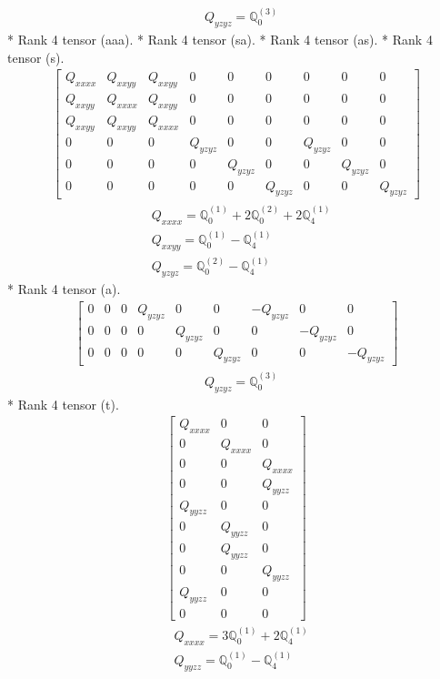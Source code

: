 \documentclass[fleqn,8pt,landscape]{jsarticle}
\begin{document}
\begin{align*}
& Q_{yzyz} = \mathbb{Q}_{0}^{(3)}
\end{align*}
* Rank 4 tensor (aaa).
* Rank 4 tensor (sa).
* Rank 4 tensor (as).
* Rank 4 tensor (s).
\begin{align*}
\begin{bmatrix} Q_{xxxx} & Q_{xxyy} & Q_{xxyy} & 0 & 0 & 0 & 0 & 0 & 0 \\ Q_{xxyy} & Q_{xxxx} & Q_{xxyy} & 0 & 0 & 0 & 0 & 0 & 0 \\ Q_{xxyy} & Q_{xxyy} & Q_{xxxx} & 0 & 0 & 0 & 0 & 0 & 0 \\ 0 & 0 & 0 & Q_{yzyz} & 0 & 0 & Q_{yzyz} & 0 & 0 \\ 0 & 0 & 0 & 0 & Q_{yzyz} & 0 & 0 & Q_{yzyz} & 0 \\ 0 & 0 & 0 & 0 & 0 & Q_{yzyz} & 0 & 0 & Q_{yzyz} \end{bmatrix}
\end{align*}
\begin{align*}
& Q_{xxxx} = \mathbb{Q}_{0}^{(1)} + 2 \mathbb{Q}_{0}^{(2)} + 2 \mathbb{Q}_{4}^{(1)} \\
& Q_{xxyy} = \mathbb{Q}_{0}^{(1)} - \mathbb{Q}_{4}^{(1)} \\
& Q_{yzyz} = \mathbb{Q}_{0}^{(2)} - \mathbb{Q}_{4}^{(1)}
\end{align*}
* Rank 4 tensor (a).
\begin{align*}
\begin{bmatrix} 0 & 0 & 0 & Q_{yzyz} & 0 & 0 & - Q_{yzyz} & 0 & 0 \\ 0 & 0 & 0 & 0 & Q_{yzyz} & 0 & 0 & - Q_{yzyz} & 0 \\ 0 & 0 & 0 & 0 & 0 & Q_{yzyz} & 0 & 0 & - Q_{yzyz} \end{bmatrix}
\end{align*}
\begin{align*}
& Q_{yzyz} = \mathbb{Q}_{0}^{(3)}
\end{align*}
* Rank 4 tensor (t).
\begin{align*}
\begin{bmatrix} Q_{xxxx} & 0 & 0 \\ 0 & Q_{xxxx} & 0 \\ 0 & 0 & Q_{xxxx} \\ 0 & 0 & Q_{yyzz} \\ Q_{yyzz} & 0 & 0 \\ 0 & Q_{yyzz} & 0 \\ 0 & Q_{yyzz} & 0 \\ 0 & 0 & Q_{yyzz} \\ Q_{yyzz} & 0 & 0 \\ 0 & 0 & 0 \end{bmatrix}
\end{align*}
\begin{align*}
& Q_{xxxx} = 3 \mathbb{Q}_{0}^{(1)} + 2 \mathbb{Q}_{4}^{(1)} \\
& Q_{yyzz} = \mathbb{Q}_{0}^{(1)} - \mathbb{Q}_{4}^{(1)}
\end{align*}
\end{document}

